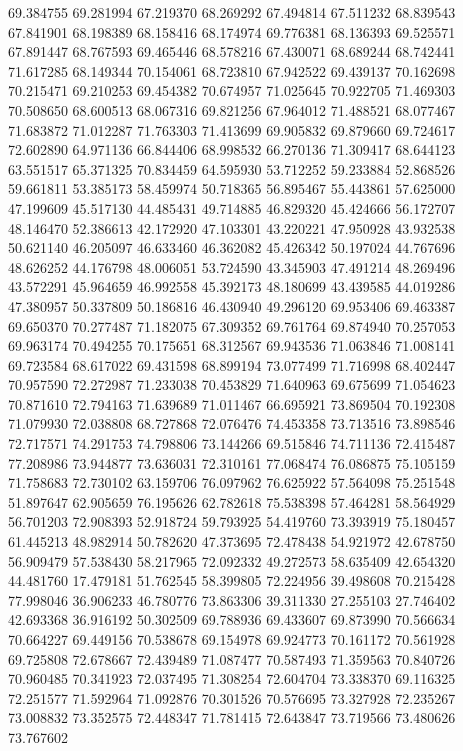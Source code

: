69.384755
69.281994
67.219370
68.269292
67.494814
67.511232
68.839543
67.841901
68.198389
68.158416
68.174974
69.776381
68.136393
69.525571
67.891447
68.767593
69.465446
68.578216
67.430071
68.689244
68.742441
71.617285
68.149344
70.154061
68.723810
67.942522
69.439137
70.162698
70.215471
69.210253
69.454382
70.674957
71.025645
70.922705
71.469303
70.508650
68.600513
68.067316
69.821256
67.964012
71.488521
68.077467
71.683872
71.012287
71.763303
71.413699
69.905832
69.879660
69.724617
72.602890
64.971136
66.844406
68.998532
66.270136
71.309417
68.644123
63.551517
65.371325
70.834459
64.595930
53.712252
59.233884
52.868526
59.661811
53.385173
58.459974
50.718365
56.895467
55.443861
57.625000
47.199609
45.517130
44.485431
49.714885
46.829320
45.424666
56.172707
48.146470
52.386613
42.172920
47.103301
43.220221
47.950928
43.932538
50.621140
46.205097
46.633460
46.362082
45.426342
50.197024
44.767696
48.626252
44.176798
48.006051
53.724590
43.345903
47.491214
48.269496
43.572291
45.964659
46.992558
45.392173
48.180699
43.439585
44.019286
47.380957
50.337809
50.186816
46.430940
49.296120
69.953406
69.463387
69.650370
70.277487
71.182075
67.309352
69.761764
69.874940
70.257053
69.963174
70.494255
70.175651
68.312567
69.943536
71.063846
71.008141
69.723584
68.617022
69.431598
68.899194
73.077499
71.716998
68.402447
70.957590
72.272987
71.233038
70.453829
71.640963
69.675699
71.054623
70.871610
72.794163
71.639689
71.011467
66.695921
73.869504
70.192308
71.079930
72.038808
68.727868
72.076476
74.453358
73.713516
73.898546
72.717571
74.291753
74.798806
73.144266
69.515846
74.711136
72.415487
77.208986
73.944877
73.636031
72.310161
77.068474
76.086875
75.105159
71.758683
72.730102
63.159706
76.097962
76.625922
57.564098
75.251548
51.897647
62.905659
76.195626
62.782618
75.538398
57.464281
58.564929
56.701203
72.908393
52.918724
59.793925
54.419760
73.393919
75.180457
61.445213
48.982914
50.782620
47.373695
72.478438
54.921972
42.678750
56.909479
57.538430
58.217965
72.092332
49.272573
58.635409
42.654320
44.481760
17.479181
51.762545
58.399805
72.224956
39.498608
70.215428
77.998046
36.906233
46.780776
73.863306
39.311330
27.255103
27.746402
42.693368
36.916192
50.302509
69.788936
69.433607
69.873990
70.566634
70.664227
69.449156
70.538678
69.154978
69.924773
70.161172
70.561928
69.725808
72.678667
72.439489
71.087477
70.587493
71.359563
70.840726
70.960485
70.341923
72.037495
71.308254
72.604704
73.338370
69.116325
72.251577
71.592964
71.092876
70.301526
70.576695
73.327928
72.235267
73.008832
73.352575
72.448347
71.781415
72.643847
73.719566
73.480626
73.767602
